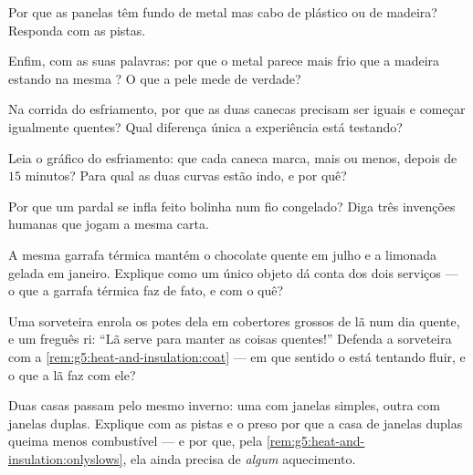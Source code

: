 \begin{exercise}[$\star$]\label{exo:g5:heat-and-insulation:4}
Por que as panelas têm fundo de metal mas cabo de plástico ou de
madeira? Responda com as pistas.
\end{exercise}

\begin{exercise}[$\star$]\label{exo:g5:heat-and-insulation:5}
Enfim, com as suas palavras: por que o metal parece mais frio que a
madeira estando na mesma ? O que a pele mede de verdade?
\end{exercise}

\begin{exercise}[$\star$]\label{exo:g5:heat-and-insulation:6}
Na corrida do esfriamento, por que as duas canecas precisam ser
iguais e começar igualmente quentes? Qual diferença única a
experiência está testando?
\end{exercise}

\begin{exercise}[$\star$]\label{exo:g5:heat-and-insulation:7}
Leia o gráfico do esfriamento: que  cada caneca marca,
mais ou menos, depois de $15$ minutos? Para qual  as duas
curvas estão indo, e por quê?
\end{exercise}

\begin{exercise}[$\star$]\label{exo:g5:heat-and-insulation:8}
Por que um pardal se infla feito bolinha num fio congelado? Diga três
invenções humanas que jogam a mesma carta.
\end{exercise}

\begin{exercise}[$\star\star$]\label{exo:g5:heat-and-insulation:9}
A mesma garrafa térmica mantém o chocolate quente em julho e a
limonada gelada em janeiro. Explique como um único objeto dá conta
dos dois serviços --- o que a garrafa térmica faz de fato, e com o
quê?
\end{exercise}

\begin{exercise}[$\star\star$]\label{exo:g5:heat-and-insulation:10}
Uma sorveteira enrola os potes dela em cobertores grossos de lã num
dia quente, e um freguês ri: ``Lã serve para manter as coisas
quentes!'' Defenda a sorveteira com a
\cref{rem:g5:heat-and-insulation:coat} --- em que sentido o 
está tentando fluir, e o que a lã faz com ele?
\end{exercise}

\begin{exercise}[$\star\star$]\label{exo:g5:heat-and-insulation:11}
Duas casas passam pelo mesmo inverno: uma com janelas simples, outra
com janelas duplas. Explique com as pistas e o  preso por que a
casa de janelas duplas queima menos combustível --- e por que, pela
\cref{rem:g5:heat-and-insulation:onlyslows}, ela ainda precisa de
\emph{algum} aquecimento.
\end{exercise}
